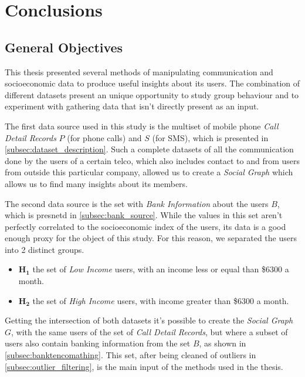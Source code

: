 \chapter{Conclusions}

\section{General Objectives}

This thesis presented several methods of manipulating communication and socioeconomic data to produce useful insights about its users.
The combination of different datasets present an unique opportunity to study group behaviour and to experiment with gathering data that isn't directly present as an input.

The first data source used in this study is the multiset of mobile phone \emph{Call Detail Records} $P$ (for phone calls) and $S$ (for SMS), which is presented in \cref{subsec:dataset_description}.
Such a complete datasets of all the communication done by the users of a certain telco, which also includes contact to and from users from outside this particular company, allowed us to create a \emph{Social Graph} which allows us to find many insights about its members.

The second data source is the set with \emph{Bank Information} about the users $B$, which is presnetd in \cref{subsec:bank_source}.
While the values in this set aren't perfectly correlated to the socioeconomic index of the users, its data is a good enough proxy for the object of this study.
For this reason, we separated the users into 2 distinct groups\footnotemark{}.


\begin{itemize}
	\item $\mathbf{H_1}$ the set of \emph{Low Income} users, with an income less or equal than \$6300 a month. \\
	\item $\mathbf{H_2}$ the set of \emph{High Income} users, with income greater than \$6300 a month.
\end{itemize}

Getting the intersection of both datasets it's possible to create the \emph{Social Graph} $G$, with the same users of the set of \emph{Call Detail Records}, but where a subset of users also contain banking information from the set $B$, as shown in \cref{subsec:banktencomathing}.
This set, after being cleaned of outliers in \cref{subsec:outlier_filtering}, is the main input of the methods used in the thesis.


